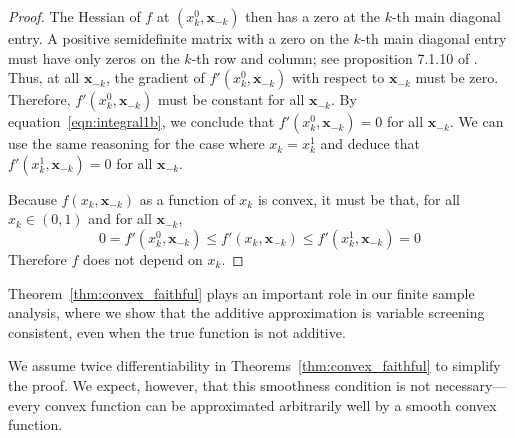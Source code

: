 \begin{proof}
The Hessian of $f$ at $(x^0_k, \mathbf{x}_{-k})$ then has a zero at
the $k$-th main diagonal entry. A positive semidefinite matrix with a
zero on the $k$-th main diagonal entry must have only zeros on the
$k$-th row and column; see proposition 7.1.10 of
\citet{HJ90}.  Thus, at all $\mathbf{x}_{-k}$, the
gradient of $f'(x^0_k, \mathbf{x}_{-k})$ with respect to
$\mathbf{x}_{-k}$ must be zero.
Therefore, $f'(x_k^0, \mathbf{x}_{-k})$ must be constant for all
$\mathbf{x}_{-k}$. By equation~\ref{eqn:integral1b}, we conclude 
that $f'(x_k^0, \mathbf{x}_{-k}) = 0$ for all $\mathbf{x}_{-k}$. We
can use the same reasoning for the case where $x_k = x_k^1$ and deduce
that $f'(x^1_k, \mathbf{x}_{-k}) = 0$ for all $\mathbf{x}_{-k}$. 

Because $f(x_k, \mathbf{x}_{-k})$ as a function of $x_k$ is convex, it must be that, for all $x_k \in (0,1)$ and for all $\mathbf{x}_{-k}$,
\begin{equation}
0 = f'(x_k^0, \mathbf{x}_{-k}) \leq f'(x_k, \mathbf{x}_{-k}) \leq 
    f'(x_k^1, \mathbf{x}_{-k}) = 0
\end{equation}
Therefore $f$ does not depend on $x_k$.


\end{proof}

Theorem~\ref{thm:convex_faithful} plays an important role in our
finite sample analysis, where we show that the additive
approximation is variable screening consistent, even when the true function is not
additive.


\begin{remark}
  We assume twice differentiability in
  Theorems~\ref{thm:convex_faithful} to simplify the proof.  We
  expect, however, that this smoothness condition is not
  necessary---every convex function can be approximated arbitrarily
  well by a smooth convex function.
\end{remark}


